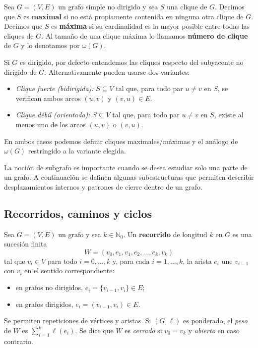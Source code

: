         \begin{definicion}
            Sea $G=(V,E)$ un grafo simple no dirigido y sea $S$ una clique de $G$. Decimos que $S$ es \textbf{maximal} si no está propiamente contenida en ninguna otra clique de $G$. Decimos que $S$ es \textbf{máxima} si su cardinalidad es la mayor posible entre todas las cliques de $G$. Al tamaño de una clique máxima lo llamamos \textbf{número de clique} de $G$ y lo denotamos por $\omega(G)$.
        \end{definicion}

        \begin{observacion}
            Si $G$ es dirigido, por defecto entendemos las cliques respecto del subyacente no dirigido de $G$. Alternativamente pueden usarse dos variantes:
            \begin{itemize}
                \item \emph{Clique fuerte (bidirigida):} $S\subseteq V$ tal que, para todo par $u\ne v$ en $S$, se verifican ambos arcos $(u,v)$ y $(v,u)\in E$.
                \item \emph{Clique débil (orientada):} $S\subseteq V$ tal que, para todo par $u\ne v$ en $S$, existe al menos uno de los arcos $(u,v)$ o $(v,u)$.
            \end{itemize}
            En ambos casos podemos definir cliques maximales/máximas y el análogo de $\omega(G)$ restringido a la variante elegida.
        \end{observacion}


        La noción de subgrafo es importante cuando se desea estudiar solo una parte de un grafo. A continuación se definen algunas subestructuras que permiten describir desplazamientos internos y patrones de cierre dentro de un grafo.

         \subsection{Recorridos, caminos y ciclos}

            \begin{definicion}[Recorrido]
                Sea $G=(V,E)$ un grafo y sea $k\in\mathbb{N}_0$. Un \textbf{recorrido} de longitud $k$ en $G$ es una sucesión finita
                \[
                W=(v_0,e_1,v_1,e_2,\dots,e_k,v_k)
                \]
                tal que $v_i\in V$ para todo $i=0,\dots,k$ y, para cada $i=1,\dots,k$, la arista $e_i$ une $v_{i-1}$ con $v_i$ en el sentido correspondiente:
                \begin{itemize}
                  \item en grafos no dirigidos, $e_i=\{v_{i-1},v_i\}\in E$;
                  \item en grafos dirigidos, $e_i=(v_{i-1},v_i)\in E$.
                \end{itemize}
                Se permiten repeticiones de vértices y aristas. Si $(G,\ell)$ es ponderado, el \emph{peso} de $W$ es $\sum_{i=1}^k \ell(e_i)$. Se dice que $W$ es \emph{cerrado} si $v_0=v_k$ y \emph{abierto} en caso contrario.
            \end{definicion}

